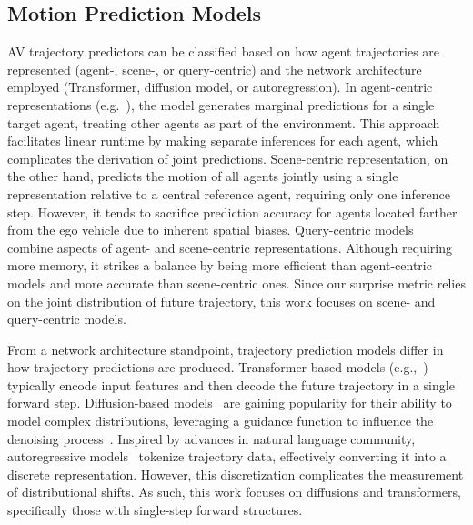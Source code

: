 \subsection{Motion Prediction Models}
AV trajectory predictors can be classified based on how agent trajectories are represented (agent-, scene-, or query-centric) and the network architecture employed (Transformer, diffusion model, or autoregression). In agent-centric representations (e.g.~\cite{zhao2021tnt,gu2021densetnt,shi2022motion}), the model generates marginal predictions for a single target agent, treating other agents as part of the environment. This approach facilitates linear runtime by making separate inferences for each agent, which complicates the derivation of joint predictions. Scene-centric representation, on the other hand, predicts the motion of all agents jointly using a single representation relative to a central reference agent, requiring only one inference step. However, it tends to sacrifice prediction accuracy for agents located farther from the ego vehicle due to inherent spatial biases. Query-centric models~\cite{zhou2023query,shi2024mtr++} combine aspects of agent- and scene-centric representations. Although requiring more memory, it strikes a balance by being more efficient than agent-centric models and more accurate than scene-centric ones. Since our surprise metric relies on the joint distribution of future trajectory, this work focuses on scene- and query-centric models.

From a network architecture standpoint, trajectory prediction models differ in how trajectory predictions are produced. 
Transformer-based models (e.g.,~\cite{ngiam2021scene,girgis2021latent}) typically encode input features and then decode the future trajectory in a single forward step. Diffusion-based models~\cite{ho2020denoising} are gaining popularity for their ability to model complex distributions, leveraging a guidance function to influence the denoising process~\cite{zhong2023guided,zhong2023language,huang2024versatile,jiang2023motiondiffuser}. Inspired by advances in natural language community, autoregressive models~\cite{zhang2024closed,philion2024trajeglish,wu2024smart,hu2025solving,zhao2024kigras,seff2023motionlm} tokenize trajectory data, effectively converting it into a discrete representation. However, this discretization complicates the measurement of distributional shifts. As such, this work focuses on diffusions and transformers, specifically those with single-step forward structures.